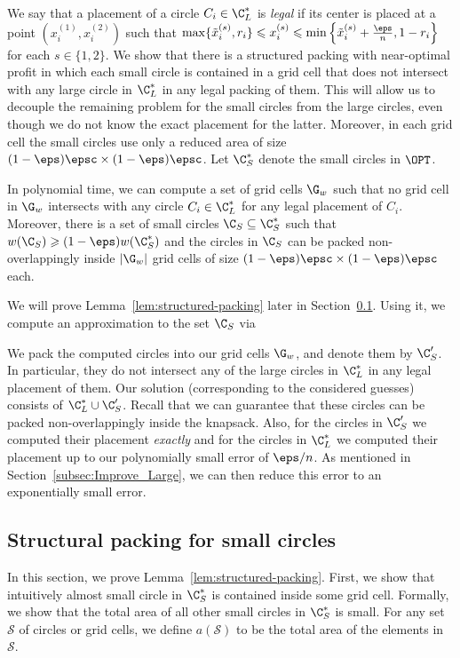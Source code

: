We say that a placement of a circle $C_{i}\in\C_{L}^{*}$ is \emph{legal} if its
center is placed at a point $(x_{i}^{(1)},x_{i}^{(2)})$ such that
$\max\{\tilde{x}_{i}^{(s)},r_{i}\}\leqslant x_{i}^{(s)}\leqslant\min\left\{ \tilde{x}_{i}^{(s)}+\frac{\eps}{n},1-r_{i}\right\} $
for each $s\in\{1,2\}$. We show that there is a structured packing with near-optimal profit in which each small circle is contained in a grid cell
that does not intersect with any large circle in $\C_{L}^{*}$ in any legal packing of them. This will allow us to decouple the remaining problem
for the small circles from the large circles, even though we do not know the exact placement for the latter.
Moreover, in each grid cell the small circles use only a reduced area of size $(1-\eps) \epsc \times(1-\eps) \epsc$.
Let $\C_{S}^{*}$ denote the small circles in $\OPT$.

\begin{lemma}\label{lem:structured-packing}
	In polynomial time, we can compute a set of grid cells $\G_w$ such that no grid cell in $\G_w$ intersects with any
	circle $C_i \in\C_{L}^{*}$ for any legal placement of $C_i$. Moreover, there is a set of small circles $\C_S \subseteq \C_{S}^{*}$ such that $w(\C_{S}) \geqslant (1-\eps)w(\C_{S}^{*})$ and
	the circles in $\C_S$ can be packed non-overlappingly inside $|\G_w|$ grid cells of size $(1-\eps) \epsc \times(1-\eps) \epsc$ each.
\end{lemma}
We will prove Lemma~\ref{lem:structured-packing} later in Section~\ref{sec:structured-packing}. Using it, we compute an approximation to the set $\C_S$ via 


We pack the computed circles into our grid cells $\G_w$, and denote them by $\C'_S$. In particular, they do not intersect any of the
large circles in $\C_{L}^{*}$ in any legal placement of them. Our solution (corresponding to the considered guesses) consists of $\C_{L}^{*}\cup \C'_S$. Recall that we can guarantee that these circles can be packed non-overlappingly inside the knapsack. Also, for the circles in
$\C'_S$ we computed their placement \emph{exactly} and for the circles in $\C_{L}^{*}$ we computed their placement up to our polynomially small error of $\eps/n$. As mentioned in Section~\ref{subsec:Improve_Large}, we can then reduce this error to an exponentially small error.

\subsection{Structural packing for small circles}\label{sec:structured-packing}
In this section, we prove Lemma~\ref{lem:structured-packing}.
First, we show that intuitively almost  small circle in $\C_{S}^{*}$ is contained inside some grid cell.
Formally, we show that the total area of all other small circles in $\C_{S}^{*}$ is small.
For any set $\mathcal{S}$ of circles or grid cells, we define $a(\mathcal{S})$ to be the total area of the elements in $\mathcal{S}$.

